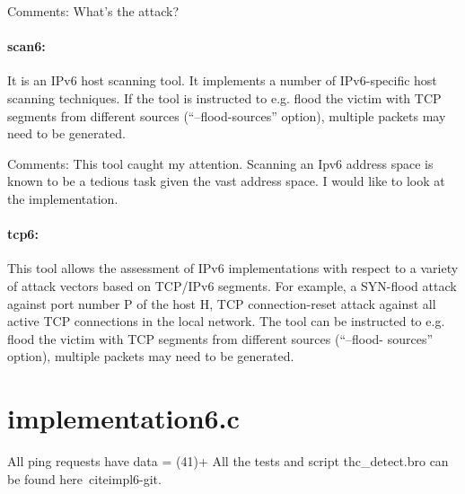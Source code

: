 \documentclass{article}
\begin{document}
Comments: What's the attack?

\paragraph*{scan6:} It is an IPv6 host scanning tool. It implements a number of IPv6-specific host scanning techniques. If the tool is instructed to e.g. flood the victim with TCP segments from different sources (“--flood-sources” option), multiple packets may need to be generated.

Comments: This tool caught my attention. Scanning an Ipv6 address space is known to be a tedious task given the vast address space. I would like to look at the implementation.

\paragraph*{tcp6:} This tool allows the assessment of IPv6 implementations with respect to a variety of attack vectors
based on TCP/IPv6 segments. For example, a SYN-flood attack against port number P of the host H, TCP connection-reset attack against all
active TCP connections in the local network.
 The tool can be instructed to e.g. flood the victim with TCP segments from different sources (“--flood-
sources” option), multiple packets may need to be generated.		


\section{implementation6.c}
All ping requests have data = (41)+
All the tests and script thc\_detect.bro can be found here~cite{impl6-git}.
\end{document}
